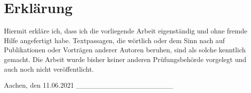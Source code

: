 \hypertarget{erkluxe4rung}{%
\section{Erklärung}\label{erkluxe4rung}}

Hiermit erkläre ich, dass ich die vorliegende Arbeit eigenständig und
ohne fremde Hilfe angefertigt habe. Textpassagen, die wörtlich oder dem
Sinn nach auf Publikationen oder Vorträgen anderer Autoren beruhen, sind
als solche kenntlich gemacht. Die Arbeit wurde bisher keiner anderen
Prüfungsbehörde vorgelegt und auch noch nicht veröffentlicht.

Aachen, den 11.06.2021 \_\_\_\_\_\_\_\_\_\_\_\_\_\_\_\_\_\_\_
